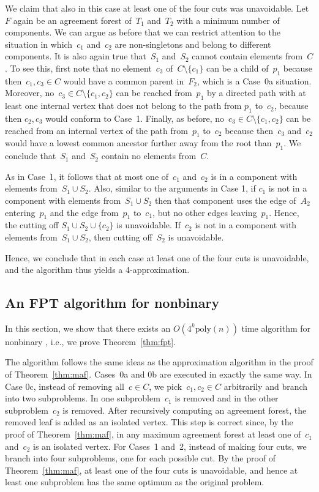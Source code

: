 We claim that also in this case at least one of the four cuts was unavoidable. Let~$F$ again be an agreement forest of~$T_1$ and~$T_2$ with a minimum number of components. We can argue as before that we can restrict attention to the situation in which~$c_1$ and~$c_2$ are non-singletons and belong to different components. It is also again true that~$S_1$ and~$S_2$ cannot contain elements from~$C$. To see this, first note that no element~$c_3$ of~$C\setminus\{c_1\}$ can be a child of~$p_1$ because then~$c_1,c_3\in C$ would have a common parent in~$F_2$, which is a Case~0a situation. Moreover, no~$c_3\in C\setminus\{c_1,c_2\}$ can be reached from~$p_1$ by a directed path with at least one internal vertex that does not belong to the path from $p_1$ to~$c_2$, because then $c_2,c_3$ would conform to Case~1. Finally, as before, no~$c_3\in C\setminus\{c_1,c_2\}$ can be reached from an internal vertex of the path from~$p_1$ to~$c_2$ because then~$c_3$ and~$c_2$ would have a lowest common ancestor further away from the root than~$p_1$. We conclude that~$S_1$ and~$S_2$ contain no elements from~$C$.

As in Case~1, it follows that at most one of~$c_1$ and~$c_2$ is in a component with elements from~$S_1\cup S_2$. Also, similar to the arguments in Case 1, if $c_1$ is not in a component with elements from~$S_1\cup S_2$ then that component uses the edge of~$A_2$ entering~$p_1$ and the edge from~$p_1$ to~$c_1$, but no other edges leaving~$p_1$. Hence, the cutting off $S_1\cup S_2\cup \{c_2\}$ is unavoidable. If~$c_2$ is not in a component with elements from~$S_1\cup S_2$, then cutting off~$S_2$ is unavoidable.

Hence, we conclude that in each case at least one of the four cuts is unavoidable, and the algorithm thus yields a 4-approximation.

\subsection*{An FPT algorithm for nonbinary \maf}

In this section, we show that there exists an $O(4^k \text{poly}(n))$ time algorithm for nonbinary \maf, i.e., we prove Theorem~\ref{thm:fpt}.

The algorithm follows the same ideas as the approximation algorithm in the proof of Theorem~\ref{thm:maf}. Cases~0a and 0b are executed in exactly the same way. In Case 0c, instead of removing all~$c\in C$, we pick~$c_1,c_2\in C$ arbitrarily and branch into two subproblems. In one subproblem~$c_1$ is removed and in the other subproblem~$c_2$ is removed. After recursively computing an agreement forest, the removed leaf is added as an isolated vertex. This step is correct since, by the proof of Theorem~\ref{thm:maf}, in any maximum agreement forest at least one of~$c_1$ and~$c_2$ is an isolated vertex. For Cases~1 and~2, instead of making four cuts, we branch into four subproblems, one for each possible cut. By the proof of Theorem~\ref{thm:maf}, at least one of the four cuts is unavoidable, and hence at least one subproblem has the same optimum as the original problem.

